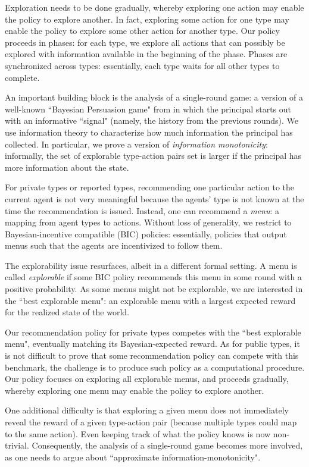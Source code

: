 Exploration needs to be done gradually, whereby exploring one action may enable the policy to explore another. In fact, exploring some action for one type may enable the policy to explore some other action for another type. Our policy proceeds in phases: for each type, we explore all actions that can possibly be explored with information available in the beginning of the phase. Phases are synchronized across types: essentially, each type waits for all other types to complete.

An important building block is the analysis of a single-round game: a version of a well-known ``Bayesian Persuasion game" from \cite{Kamenica-aer11} in which the principal starts out with an informative ``signal" (namely, the history from the previous rounds). We use information theory to characterize how much information the principal has collected. In particular, we prove a version of \emph{information monotonicity}: informally, the set of explorable type-action pairs set is larger if the principal has more information about the state.


For private types or reported types, recommending one particular action to the current agent is not very meaningful because the agents' type is not known at the time the recommendation is issued. Instead, one can recommend a \emph{menu}: a mapping from agent types to actions. Without loss of generality, we restrict to  Bayesian-incentive compatible (BIC) policies: essentially, policies that output menus such that the agents are incentivized to follow them.

The explorability issue resurfaces, albeit in a different formal setting. A menu is called \emph{explorable} if some BIC policy recommends this menu in some round with a positive probability. As some menus might not be explorable, we are interested in the ``best explorable menu": an explorable menu with a largest expected reward for the realized state of the world.

Our recommendation policy for private types competes with the ``best explorable menu", eventually matching its Bayesian-expected reward. As for public types, it is not difficult to prove that some recommendation policy can compete with this benchmark, the challenge is to produce such policy as a computational procedure. Our policy focuses on exploring all explorable menus, and proceeds gradually, whereby exploring one menu may enable the policy to explore another. 

One additional difficulty is that exploring a given menu does not immediately reveal the reward of a given type-action pair (because multiple types could map to the same action). Even keeping track of what the policy knows is now non-trivial. Consequently, the analysis of a single-round game becomes more involved, as one needs to argue about ``approximate information-monotonicity".
 
